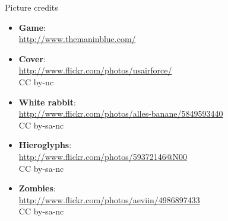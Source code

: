 \begin{frame}[plain]{Picture credits}
  \scriptsize
  \begin{itemize}
    \item \textbf{Game}:\\ \url{http://www.themaninblue.com/}\\ 
    \item \textbf{Cover}:\\ \url{http://www.flickr.com/photos/usairforce/}\\ CC by-nc
    \item \textbf{White rabbit}:\\ \url{http://www.flickr.com/photos/alles-banane/5849593440}\\ CC by-sa-nc
    \item \textbf{Hieroglyphs}:\\ \url{http://www.flickr.com/photos/59372146@N00}\\ CC by-sa-nc
    \item \textbf{Zombies}:\\ \url{http://www.flickr.com/photos/aeviin/4986897433}\\ CC by-sa-nc
  \end{itemize}
\end{frame}
